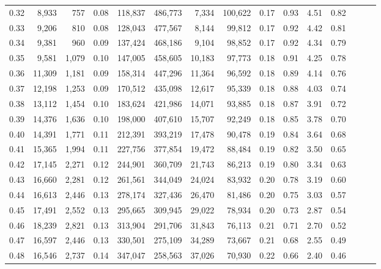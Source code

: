 \begin{tabular}{rrrrrrrrrrrrrrr}
0.32 &   8,933 &    757 &  0.08 &  118,837 &  486,773 &    7,334 &  100,622 &  0.17 &  0.93 &  4.51 &      0.82 \\
0.33 &   9,206 &    810 &  0.08 &  128,043 &  477,567 &    8,144 &   99,812 &  0.17 &  0.92 &  4.42 &      0.81 \\
0.34 &   9,381 &    960 &  0.09 &  137,424 &  468,186 &    9,104 &   98,852 &  0.17 &  0.92 &  4.34 &      0.79 \\
0.35 &   9,581 &  1,079 &  0.10 &  147,005 &  458,605 &   10,183 &   97,773 &  0.18 &  0.91 &  4.25 &      0.78 \\
0.36 &  11,309 &  1,181 &  0.09 &  158,314 &  447,296 &   11,364 &   96,592 &  0.18 &  0.89 &  4.14 &      0.76 \\
0.37 &  12,198 &  1,253 &  0.09 &  170,512 &  435,098 &   12,617 &   95,339 &  0.18 &  0.88 &  4.03 &      0.74 \\
0.38 &  13,112 &  1,454 &  0.10 &  183,624 &  421,986 &   14,071 &   93,885 &  0.18 &  0.87 &  3.91 &      0.72 \\
0.39 &  14,376 &  1,636 &  0.10 &  198,000 &  407,610 &   15,707 &   92,249 &  0.18 &  0.85 &  3.78 &      0.70 \\
0.40 &  14,391 &  1,771 &  0.11 &  212,391 &  393,219 &   17,478 &   90,478 &  0.19 &  0.84 &  3.64 &      0.68 \\
0.41 &  15,365 &  1,994 &  0.11 &  227,756 &  377,854 &   19,472 &   88,484 &  0.19 &  0.82 &  3.50 &      0.65 \\
0.42 &  17,145 &  2,271 &  0.12 &  244,901 &  360,709 &   21,743 &   86,213 &  0.19 &  0.80 &  3.34 &      0.63 \\
0.43 &  16,660 &  2,281 &  0.12 &  261,561 &  344,049 &   24,024 &   83,932 &  0.20 &  0.78 &  3.19 &      0.60 \\
0.44 &  16,613 &  2,446 &  0.13 &  278,174 &  327,436 &   26,470 &   81,486 &  0.20 &  0.75 &  3.03 &      0.57 \\
0.45 &  17,491 &  2,552 &  0.13 &  295,665 &  309,945 &   29,022 &   78,934 &  0.20 &  0.73 &  2.87 &      0.54 \\
0.46 &  18,239 &  2,821 &  0.13 &  313,904 &  291,706 &   31,843 &   76,113 &  0.21 &  0.71 &  2.70 &      0.52 \\
0.47 &  16,597 &  2,446 &  0.13 &  330,501 &  275,109 &   34,289 &   73,667 &  0.21 &  0.68 &  2.55 &      0.49 \\
0.48 &  16,546 &  2,737 &  0.14 &  347,047 &  258,563 &   37,026 &   70,930 &  0.22 &  0.66 &  2.40 &      0.46 \\

\end{tabular}
